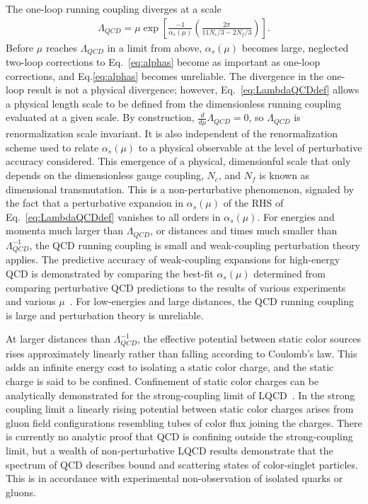 The one-loop running coupling diverges at a scale
\begin{equation}
  \begin{split}
  \Lambda_{QCD} = \mu \exp\left[ \frac{-1}{\alpha_s(\mu)}\left(\frac{2\pi}{11N_c/3 - 2N_f/3}\right) \right].
  \end{split}\label{eq:LambdaQCDdef}
\end{equation}
Before $\mu$ reaches $\Lambda_{QCD}$ in a limit from above, $\alpha_s(\mu)$ becomes large, neglected two-loop corrections to Eq.~\eqref{eq:alphas} become as important as one-loop corrections, and Eq.\eqref{eq:alphas} becomes unreliable.
The divergence in the one-loop result is not a physical divergence; however, Eq.~\eqref{eq:LambdaQCDdef} allows a physical length scale to be defined from the dimensionless running coupling evaluated at a given scale.
By construction, $\frac{d}{d\mu}\Lambda_{QCD}=0$, so $\Lambda_{QCD}$ is renormalization scale invariant.
It is also independent of the renormalization scheme used to relate $\alpha_s(\mu)$ to a physical observable at the level of perturbative accuracy considered.
This emergence of a physical, dimensionful scale that only depends on the dimensionless gauge coupling, $N_c$, and $N_f$ is known as dimensional transmutation.
This is a non-perturbative phenomenon, signaled by the fact that a perturbative expansion in $\alpha_s(\mu)$ of the RHS of Eq.~\eqref{eq:LambdaQCDdef} vanishes to all orders in $\alpha_s(\mu)$.
For energies and momenta much larger than $\Lambda_{QCD}$, or distances and times much smaller than $\Lambda_{QCD}^{-1}$, the QCD running coupling is small and weak-coupling perturbation theory applies.
The predictive accuracy of weak-coupling expansions for high-energy QCD is demonstrated by comparing the best-fit $\alpha_s(\mu)$ determined from comparing perturbative QCD predictions to the results of various experiments and various $\mu$~\cite{Bethke:2009jm}.
For low-energies and large distances, the QCD running coupling is large and perturbation theory is unreliable.

At larger distances than $\Lambda_{QCD}^{-1}$, the effective potential between static color sources rises approximately linearly rather than falling according to Coulomb's law.
This adds an infinite energy cost to isolating a static color charge, and the static charge is said to be confined.
Confinement of static color charges can be analytically demonstrated for the strong-coupling limit of LQCD~\cite{Wilson:1974sk}.
In the strong coupling limit a linearly rising potential between static color charges arises from gluon field configurations resembling tubes of color flux joining the charges.
There is currently no analytic proof that QCD is confining outside the strong-coupling limit, but a wealth of non-perturbative LQCD results demonstrate that the spectrum of QCD describes bound and scattering states of color-singlet particles.
This is in accordance with experimental non-observation of isolated quarks or gluons.

